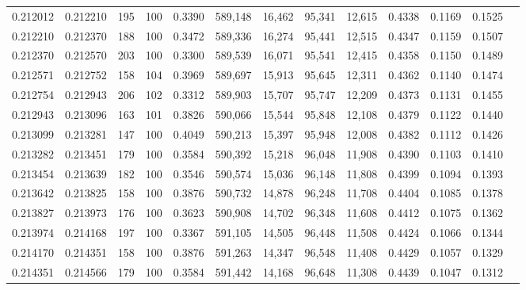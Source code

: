 \begin{tabular}{rrrrrrrrrrrrr}
0.212012 & 0.212210 &   195 & 100 &                                     0.3390 & 589,148 &  16,462 &  95,341 &  12,615 & 0.4338 & 0.1169 & 0.1525 \\
0.212210 & 0.212370 &   188 & 100 &                                     0.3472 & 589,336 &  16,274 &  95,441 &  12,515 & 0.4347 & 0.1159 & 0.1507 \\
0.212370 & 0.212570 &   203 & 100 &                                     0.3300 & 589,539 &  16,071 &  95,541 &  12,415 & 0.4358 & 0.1150 & 0.1489 \\
0.212571 & 0.212752 &   158 & 104 &                                     0.3969 & 589,697 &  15,913 &  95,645 &  12,311 & 0.4362 & 0.1140 & 0.1474 \\
0.212754 & 0.212943 &   206 & 102 &                                     0.3312 & 589,903 &  15,707 &  95,747 &  12,209 & 0.4373 & 0.1131 & 0.1455 \\
0.212943 & 0.213096 &   163 & 101 &                                     0.3826 & 590,066 &  15,544 &  95,848 &  12,108 & 0.4379 & 0.1122 & 0.1440 \\
0.213099 & 0.213281 &   147 & 100 &                                     0.4049 & 590,213 &  15,397 &  95,948 &  12,008 & 0.4382 & 0.1112 & 0.1426 \\
0.213282 & 0.213451 &   179 & 100 &                                     0.3584 & 590,392 &  15,218 &  96,048 &  11,908 & 0.4390 & 0.1103 & 0.1410 \\
0.213454 & 0.213639 &   182 & 100 &                                     0.3546 & 590,574 &  15,036 &  96,148 &  11,808 & 0.4399 & 0.1094 & 0.1393 \\
0.213642 & 0.213825 &   158 & 100 &                                     0.3876 & 590,732 &  14,878 &  96,248 &  11,708 & 0.4404 & 0.1085 & 0.1378 \\
0.213827 & 0.213973 &   176 & 100 &                                     0.3623 & 590,908 &  14,702 &  96,348 &  11,608 & 0.4412 & 0.1075 & 0.1362 \\
0.213974 & 0.214168 &   197 & 100 &                                     0.3367 & 591,105 &  14,505 &  96,448 &  11,508 & 0.4424 & 0.1066 & 0.1344 \\
0.214170 & 0.214351 &   158 & 100 &                                     0.3876 & 591,263 &  14,347 &  96,548 &  11,408 & 0.4429 & 0.1057 & 0.1329 \\
0.214351 & 0.214566 &   179 & 100 &                                     0.3584 & 591,442 &  14,168 &  96,648 &  11,308 & 0.4439 & 0.1047 & 0.1312 \\

\end{tabular}
